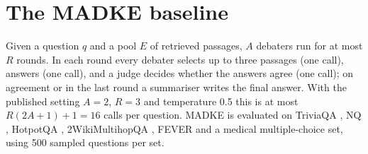 \section{The MADKE baseline}
\label{sec:baseline}

Given a question $q$ and a pool $E$ of retrieved passages, $A$ debaters run for at most $R$ rounds. In each round every debater selects up to three passages (one call), answers (one call), and a judge decides whether the answers agree (one call); on agreement or in the last round a summariser writes the final answer. With the published setting $A{=}2$, $R{=}3$ and temperature 0.5 this is at most $R(2A{+}1){+}1 = 16$ calls per question. MADKE is evaluated on TriviaQA \cite{joshi2017triviaqa}, NQ \cite{kwiatkowski2019nq}, HotpotQA \cite{yang2018hotpotqa}, 2WikiMultihopQA \cite{ho2020twowiki}, FEVER \cite{thorne2018fever} and a medical multiple-choice set, using 500 sampled questions per set.
